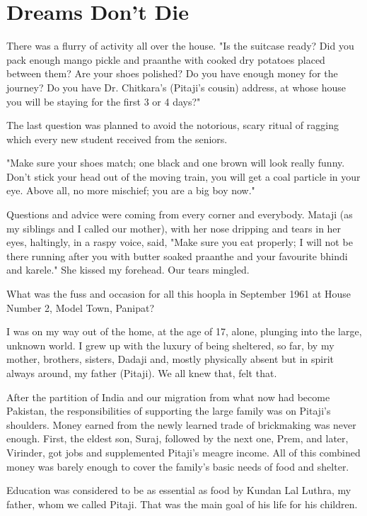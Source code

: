 \chapter{Dreams Don’t Die}
There was a flurry of activity all over the house. "Is the suitcase ready?
Did you pack enough mango pickle and praanthe with cooked dry potatoes
placed between them? Are your shoes polished? Do you have enough money for
the journey? Do you have Dr. Chitkara's (Pitaji's cousin) address, at
whose house you will be staying for the first 3 or 4 days?"

The last question was planned to avoid the notorious, scary ritual of
ragging which every new student received from the seniors.

"Make sure your shoes match; one black and one brown will look really
funny. Don't stick your head out of the moving train, you will get a coal
particle in your eye. Above all, no more mischief; you are a big boy now."

Questions and advice were coming from every corner and everybody.  Mataji
(as my siblings and I called our mother), with her nose dripping and tears
in her eyes, haltingly, in a raspy voice, said, "Make sure you eat
properly; I will not be there running after you with butter soaked
praanthe and your favourite bhindi and karele." She kissed my forehead.
Our tears mingled.

What was the fuss and occasion for all this hoopla in September 1961 at
House Number 2, Model Town, Panipat?

I was on my way out of the home, at the age of 17, alone, plunging into
the large, unknown world. I grew up with the luxury of being sheltered, so
far, by my mother, brothers, sisters, Dadaji and, mostly physically absent
but in spirit always around, my father (Pitaji). We all knew that, felt
that.

After the partition of India and our migration from what now had become
Pakistan, the responsibilities of supporting the large family was on
Pitaji's shoulders. Money earned from the newly learned trade of
brickmaking was never enough. First, the eldest son, Suraj, followed by
the next one, Prem, and later, Virinder, got jobs and supplemented
Pitaji’s meagre income. All of this combined money was barely enough to
cover the family's basic needs of food and shelter.

Education was considered to be as essential as food by Kundan Lal Luthra,
my father, whom we called Pitaji. That was the main goal of his life for
his children.

